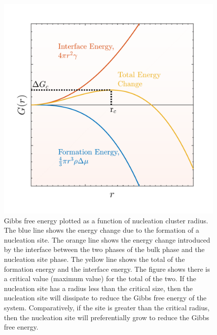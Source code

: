 \begin{figure}[h]
	\centering
	\includegraphics[width = .5\textwidth]{./Figures/CNT/cnt_energy.pdf}
	\caption[Gibbs free energy plotted as a function of nucleation cluster radius.  The blue line shows the energy change due to the formation of a nucleation site.  The orange line shows the energy change introduced by the interface between the two phases of the bulk phase and the nucleation site phase.  The yellow line shows the total of the formation energy and the interface energy.  The figure shows there is a critical value (maximum value) for the total of the two.  If the nucleation site has a radius less than the critical size, then the nucleation site will dissipate to reduce the Gibbs free energy of the system.  Comparatively, if the site is greater than the critical radius, then the nucleation site will preferentially grow to reduce the Gibbs free energy.]{Gibbs free energy plotted as a function of nucleation cluster radius.  The blue line shows the energy change due to the formation of a nucleation site.  The orange line shows the energy change introduced by the interface between the two phases of the bulk phase and the nucleation site phase.  The yellow line shows the total of the formation energy and the interface energy.  The figure shows there is a critical value (maximum value) for the total of the two.  If the nucleation site has a radius less than the critical size, then the nucleation site will dissipate to reduce the Gibbs free energy of the system.  Comparatively, if the site is greater than the critical radius, then the nucleation site will preferentially grow to reduce the Gibbs free energy. \cite{debenedetti1996metastable}}
	\label{cnt_energy}
\end{figure}

